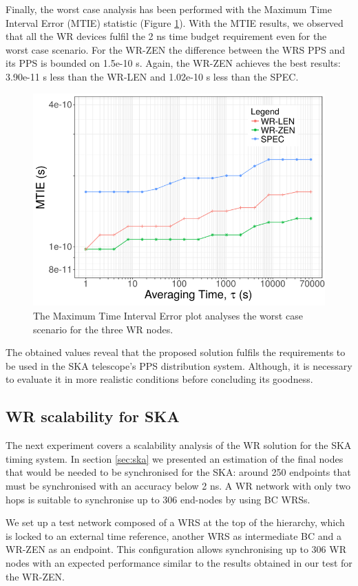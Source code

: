 Finally, the worst case analysis has been performed with the Maximum Time Interval Error (MTIE) statistic (Figure \ref{fig:mtie_exp1}). With the MTIE results, we observed that all the WR devices fulfil the 2 ns time budget requirement even for the worst case scenario. 
For the WR-ZEN the difference between the WRS PPS and its PPS is bounded on 1.5e-10 s. Again, the WR-ZEN achieves the best results: 3.90e-11 s less than the WR-LEN and 1.02e-10 s less than the SPEC.

\begin{figure}
	\centering
	\includegraphics[width=0.7\linewidth]{img/mtie_exp1}
	\caption[MTIE for the WR devices comparison.]{The Maximum Time Interval Error plot analyses the worst case scenario for the three WR nodes.}
	\label{fig:mtie_exp1}
\end{figure}

The obtained values reveal that the proposed solution fulfils the requirements 
to be used in the SKA telescope's PPS distribution system. Although, it is 
necessary to evaluate it in more realistic conditions before concluding its 
goodness.

\subsection{WR scalability for SKA}
\label{subsec: net_exp}

The next experiment covers a scalability analysis of the WR solution for the 
SKA timing system. In section \ref{sec:ska} we presented an estimation of the final nodes that would be needed to be synchronised for the SKA: around 250 endpoints that must be synchronised with an accuracy below 2 ns. A WR network with only two hops is suitable to synchronise up to 306 end-nodes by using BC WRSs.

We set up a test network composed of a WRS at the top of the hierarchy, which is locked to an external time reference, another WRS as intermediate BC and a WR-ZEN as an endpoint. This configuration allows synchronising up to 306 WR nodes with an expected performance similar to the results obtained in our test for the WR-ZEN.

